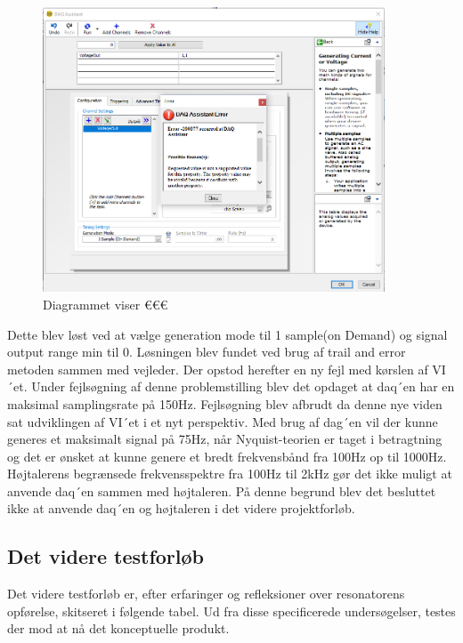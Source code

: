 \begin{figure}[htb]
			\centering
				\includegraphics[width=4in]{FejlDAQAssistant}
				\caption{Diagrammet viser €€€}	
				\label{fig:FejlDAQAssistant}
			\end{figure}
			
			
Dette blev løst ved at vælge generation mode til 1 sample(on Demand) og signal output range min til 0. Løsningen blev fundet ved brug af trail and error metoden sammen med vejleder. Der opstod herefter en ny fejl med kørslen af VI´et. Under fejlsøgning af denne problemstilling blev det opdaget at daq´en har en maksimal samplingsrate på 150Hz. Fejlsøgning blev afbrudt da denne nye viden sat udviklingen af VI´et i et nyt perspektiv. Med brug af dag´en vil der kunne generes  et maksimalt signal på 75Hz, når Nyquist-teorien er taget i betragtning og det er ønsket at kunne genere et bredt frekvensbånd fra 100Hz op til 1000Hz. Højtalerens begrænsede frekvensspektre fra 100Hz til 2kHz  gør det ikke muligt at anvende daq´en sammen med højtaleren. 
På denne begrund blev det besluttet ikke at anvende daq´en og højtaleren i det videre projektforløb. 	

\subsection{Det videre testforløb}
Det videre testforløb er, efter erfaringer og refleksioner over resonatorens opførelse, skitseret i følgende tabel. Ud fra disse specificerede undersøgelser, testes der mod at nå det konceptuelle produkt.  

